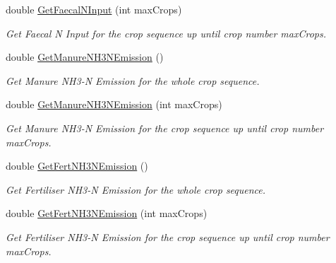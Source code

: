 \begin{DoxyCompactItemize}
double \mbox{\hyperlink{class_crop_sequence_class_a10e45bf7094f9d5db7921651218e887c}{Get\+Faecal\+N\+Input}} (int max\+Crops)
\begin{DoxyCompactList}\small\item\em Get Faecal N Input for the crop sequence up until crop number max\+Crops. \end{DoxyCompactList}\item 
\mbox{\label{class_crop_sequence_class_af8af7306c552da96cad6d197a5758aa9}} 
double \mbox{\hyperlink{class_crop_sequence_class_af8af7306c552da96cad6d197a5758aa9}{Get\+Manure\+N\+H3\+N\+Emission}} ()
\begin{DoxyCompactList}\small\item\em Get Manure N\+H3-\/N Emission for the whole crop sequence. \end{DoxyCompactList}\item 
\mbox{\label{class_crop_sequence_class_a3f7fd421be741608547d04626b904288}} 
double \mbox{\hyperlink{class_crop_sequence_class_a3f7fd421be741608547d04626b904288}{Get\+Manure\+N\+H3\+N\+Emission}} (int max\+Crops)
\begin{DoxyCompactList}\small\item\em Get Manure N\+H3-\/N Emission for the crop sequence up until crop number max\+Crops. \end{DoxyCompactList}\item 
\mbox{\label{class_crop_sequence_class_ac21baaca5d6be100861bab0428a2b980}} 
double \mbox{\hyperlink{class_crop_sequence_class_ac21baaca5d6be100861bab0428a2b980}{Get\+Fert\+N\+H3\+N\+Emission}} ()
\begin{DoxyCompactList}\small\item\em Get Fertiliser N\+H3-\/N Emission for the whole crop sequence. \end{DoxyCompactList}\item 
\mbox{\label{class_crop_sequence_class_af4c2ab1312cb344e0a1e94b3bca0e8e4}} 
double \mbox{\hyperlink{class_crop_sequence_class_af4c2ab1312cb344e0a1e94b3bca0e8e4}{Get\+Fert\+N\+H3\+N\+Emission}} (int max\+Crops)
\begin{DoxyCompactList}\small\item\em Get Fertiliser N\+H3-\/N Emission for the crop sequence up until crop number max\+Crops. \end{DoxyCompactList}\item 

\end{DoxyCompactItemize}
